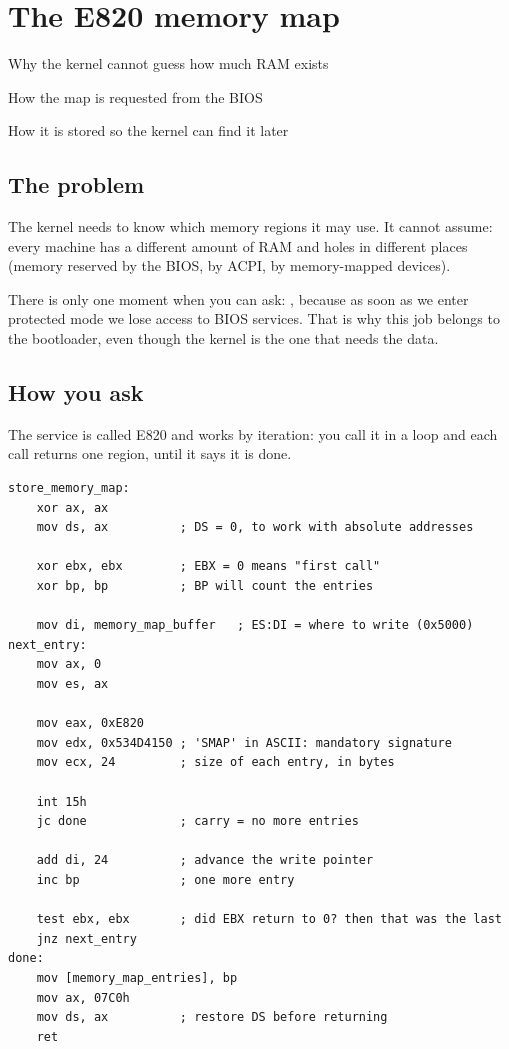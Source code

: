 \chapter{The E820 memory map}

\begin{goals}
  \item Why the kernel cannot guess how much RAM exists
  \item How the map is requested from the BIOS
  \item How it is stored so the kernel can find it later
\end{goals}

\section{The problem}

The kernel needs to know which memory regions it may use. It cannot assume: every machine has a
different amount of RAM and holes in different places (memory reserved by the BIOS, by ACPI, by
memory-mapped devices).

There is only one moment when you can ask: , because as soon as
we enter protected mode we lose access to BIOS services. That is why this job belongs to the
bootloader, even though the kernel is the one that needs the data.

\section{How you ask}

The service is called E820 and works by iteration: you call it in a loop and each call returns one
region, until it says it is done.

\begin{lstlisting}[style=asm]
store_memory_map:
    xor ax, ax
    mov ds, ax          ; DS = 0, to work with absolute addresses

    xor ebx, ebx        ; EBX = 0 means "first call"
    xor bp, bp          ; BP will count the entries

    mov di, memory_map_buffer   ; ES:DI = where to write (0x5000)
next_entry:
    mov ax, 0
    mov es, ax

    mov eax, 0xE820
    mov edx, 0x534D4150 ; 'SMAP' in ASCII: mandatory signature
    mov ecx, 24         ; size of each entry, in bytes

    int 15h
    jc done             ; carry = no more entries

    add di, 24          ; advance the write pointer
    inc bp              ; one more entry

    test ebx, ebx       ; did EBX return to 0? then that was the last
    jnz next_entry
done:
    mov [memory_map_entries], bp
    mov ax, 07C0h
    mov ds, ax          ; restore DS before returning
    ret
\end{lstlisting}

